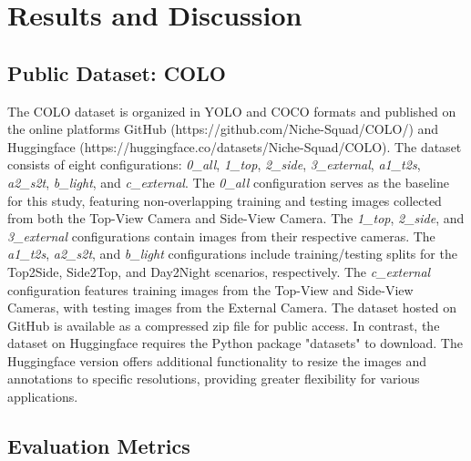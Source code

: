 \section{Results and Discussion}

\subsection*{Public Dataset: COLO}

The COLO dataset is organized in YOLO and COCO formats and published on the online platforms GitHub (https://github.com/Niche-Squad/COLO/) and Huggingface (https://huggingface.co/datasets/Niche-Squad/COLO). The dataset consists of eight configurations: \textit{0\_all}, \textit{1\_top}, \textit{2\_side}, \textit{3\_external}, \textit{a1\_t2s}, \textit{a2\_s2t}, \textit{b\_light}, and \textit{c\_external}. The \textit{0\_all} configuration serves as the baseline for this study, featuring non-overlapping training and testing images collected from both the Top-View Camera and Side-View Camera. The \textit{1\_top}, \textit{2\_side}, and \textit{3\_external} configurations contain images from their respective cameras. The \textit{a1\_t2s}, \textit{a2\_s2t}, and \textit{b\_light} configurations include training/testing splits for the Top2Side, Side2Top, and Day2Night scenarios, respectively. The \textit{c\_external} configuration features training images from the Top-View and Side-View Cameras, with testing images from the External Camera. The dataset hosted on GitHub is available as a compressed zip file for public access. In contrast, the dataset on Huggingface requires the Python package "datasets" \citep{} to download. The Huggingface version offers additional functionality to resize the images and annotations to specific resolutions, providing greater flexibility for various applications.


\subsection*{Evaluation Metrics}

